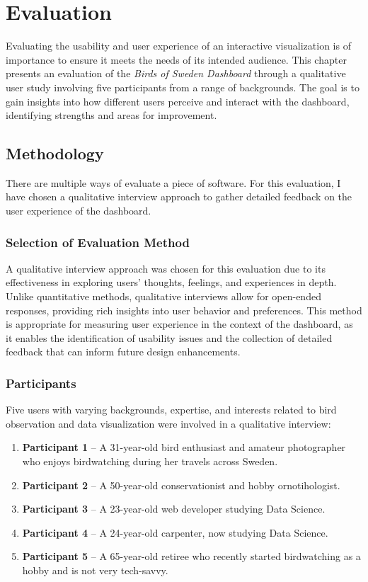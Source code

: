 \chapter{Evaluation}

Evaluating the usability and user experience of an interactive visualization is of importance to ensure it meets the needs of its intended audience. This chapter presents an evaluation of the \textit{Birds of Sweden Dashboard} through a qualitative user study involving five participants from a range of backgrounds. The goal is to gain insights into how different users perceive and interact with the dashboard, identifying strengths and areas for improvement.

\section{Methodology}

There are multiple ways of evaluate a piece of software. For this evaluation, I have chosen a qualitative interview approach to gather detailed feedback on the user experience of the dashboard.

\subsection{Selection of Evaluation Method}

A qualitative interview approach was chosen for this evaluation due to its effectiveness in exploring users' thoughts, feelings, and experiences in depth. Unlike quantitative methods, qualitative interviews allow for open-ended responses, providing rich insights into user behavior and preferences. This method is appropriate for measuring user experience in the context of the dashboard, as it enables the identification of usability issues and the collection of detailed feedback that can inform future design enhancements.

\subsection{Participants}

Five users with varying backgrounds, expertise, and interests related to bird observation and data visualization were involved in a qualitative interview:

\begin{enumerate} 
    \item \textbf{Participant 1} -- A 31-year-old bird enthusiast and amateur photographer who enjoys birdwatching during her travels across Sweden.
    \item \textbf{Participant 2} -- A 50-year-old conservationist and hobby ornotihologist.
    \item \textbf{Participant 3} -- A 23-year-old web developer studying Data Science.
    \item \textbf{Participant 4} -- A 24-year-old carpenter, now studying Data Science.
    \item \textbf{Participant 5} -- A 65-year-old retiree who recently started birdwatching as a hobby and is not very tech-savvy.
\end{enumerate}

